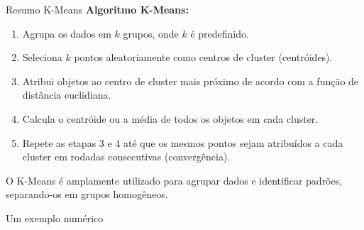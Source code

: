\documentclass{beamer}
\begin{document}
\begin{frame}{Resumo K-Means}
    \textbf{Algoritmo K-Means:}
    \begin{enumerate}
        \item Agrupa os dados em \(k\) grupos, onde \(k\) é predefinido.
        \item Seleciona \(k\) pontos aleatoriamente como centros de cluster (centróides).
        \item Atribui objetos ao centro de cluster mais próximo de acordo com a função de distância euclidiana.
        \item Calcula o centróide ou a média de todos os objetos em cada cluster.
        \item Repete as etapas 3 e 4 até que os mesmos pontos sejam atribuídos a cada cluster em rodadas consecutivas (convergência).
    \end{enumerate}
    \vspace{0.5cm}
    O K-Means é amplamente utilizado para agrupar dados e identificar padrões, separando-os em grupos homogêneos.
\end{frame}


\begin{frame}
    \centering
    \huge
    Um exemplo numérico
\end{frame}







\end{document}
